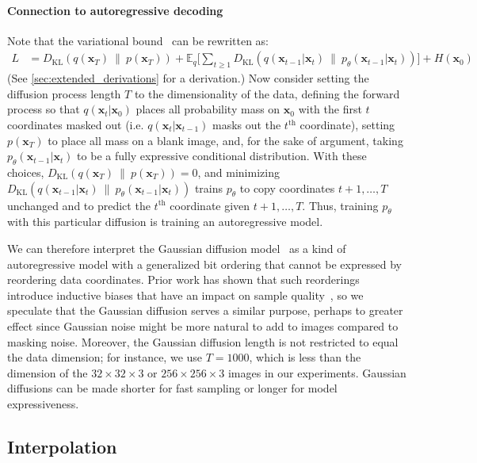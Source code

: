 \documentclass{article}
\newcommand{\kl}[2]{D_{\mathrm{KL}}\!\left(#1 ~ \| ~ #2\right)}
\newcommand{\bx}{\mathbf{x}}
\begin{document}
\paragraph{Connection to autoregressive decoding} Note that the variational bound~ can be rewritten as:
\begin{align}
  L &= \kl{q(\bx_T)}{p(\bx_T)} + \mathbb{E}_{q}\Bigg[ \sum_{t \geq 1} \kl{q(\bx_{t-1}|\bx_t)}{p_\theta(\bx_{t-1}|\bx_t)} \Bigg] + H(\bx_0)
\end{align}
(See \cref{sec:extended_derivations} for a derivation.) Now consider setting the diffusion process length $T$ to the dimensionality of the data, defining the forward process so that $q(\bx_t|\bx_0)$ places all probability mass on $\bx_0$ with the first $t$ coordinates masked out (i.e. $q(\bx_t|\bx_{t-1})$ masks out the $t^\text{th}$ coordinate), setting $p(\bx_T)$ to place all mass on a blank image, and, for the sake of argument, taking  $p_\theta(\bx_{t-1}|\bx_t)$ to be a fully expressive conditional distribution. With these choices, $\kl{q(\bx_T)}{p(\bx_T)}=0$, and minimizing $\kl{q(\bx_{t-1}|\bx_t)}{p_\theta(\bx_{t-1}|\bx_t)}$ trains $p_\theta$ to copy coordinates $t+1, \dotsc, T$ unchanged and to predict the $t^{\text{th}}$ coordinate given $t+1, \dotsc, T$. Thus, training $p_\theta$ with this particular diffusion is training an autoregressive model.

We can therefore interpret the Gaussian diffusion model~ as a kind of autoregressive model with a generalized bit ordering that cannot be expressed by reordering data coordinates. Prior work has shown that such reorderings introduce inductive biases that have an impact on sample quality~\citep{menick2018generating}, so we speculate that the Gaussian diffusion serves a similar purpose, perhaps to greater effect since Gaussian noise might be more natural to add to images compared to masking noise. Moreover, the Gaussian diffusion length is not restricted to equal the data dimension; for instance, we use $T=1000$, which is less than the dimension of the $32\times 32 \times 3$ or $256 \times 256 \times 3$ images in our experiments. Gaussian diffusions can be made shorter for fast sampling or longer for model expressiveness.


\subsection{Interpolation}
\end{document}
